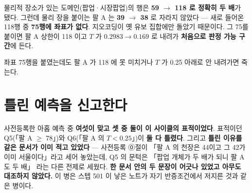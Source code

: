 \documentclass[10pt]{article}
\begin{document}
물리적 장소가 있는 도메인(팝업·시장팝업)의 행은 \textbf{59 $\to$ 118 로 정확히 두 배}가
됐다. 그런데 물리 장을 붙이는 팔 A 는 \textbf{39 $\to$ 38} 로 자라지 않았다 ---
새로 들어온 118행 중 \textbf{75행에 좌표가 없다}. 지오코딩이 옛 유보 집합에만 돌았기
때문이다. 그 75를 붙이면 팔 A 상한이 118 이고 $T$ 가 $0.2983 \to 0.169$ 로 내려가
\textbf{처음으로 판정 가능 구간}에 든다.

{좌표 75행을 붙였는데도 팔 A 가 118 에 못 미치거나 $T$ 가 0.25 아래로 안 내려가면 죽는다.}

\section{틀린 예측을 신고한다}

사전등록한 아홉 예측 중 \textbf{여섯이 맞고 셋 중 둘이 이 사이클의 표적이었다}. 표적이던
Q5(「팔 A $\ge$ 78」)와 Q6(「팔 A 의 $T<0.25$」)이 \textbf{둘 다 틀렸다}. 그리고 \textbf{틀린
이유를 같은 문서가 이미 적고 있었다} --- 사전등록 ⓪절이 「팔 A 의 천장은 44이고 그 42가
이미 서울이다」라고 세어 놓았는데, Q5 의 문턱은 「팝업 개체가 두 배가 되니 팔 A 도 두 배」
라는 다른 전제로 세웠다. \textbf{한 문서 안의 두 문장이 어긋나 있었고 아무도 대조하지
않았다.} 이 병은 스텝 501 이 낳은 노트가 자기 반증조건에서 저지른 것과 같은 병이다.
\end{document}
